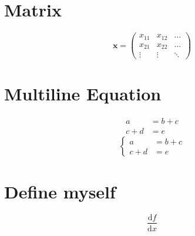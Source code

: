 \documentclass[12pt]{article}
\begin{document}
\section{Matrix}
\begin{displaymath}
  \mathbf{x} =
  \left(\begin{array}{ccc}
    x_{11} & x_{12} & \ldots \\
    x_{21} & x_{22} & \ldots \\
    \vdots & \vdots & \ddots
  \end{array}\right)
\end{displaymath}
\section{Multiline Equation}
\begin{align}
  a     &= b + c \\
  c + d &= e
\end{align}
\begin{equation}
  \left\{
  \begin{aligned}
    a     &= b + c \\
    c + d &= e
  \end{aligned}
  \right.
\end{equation}
\section{Define myself}
\newcommand{\ud}{\mathrm{d}}
\newcommand{\dif}[2]{\frac{\ud {#1}}{\ud {#2}}}
\[ \dif fx \]
\end{document}
